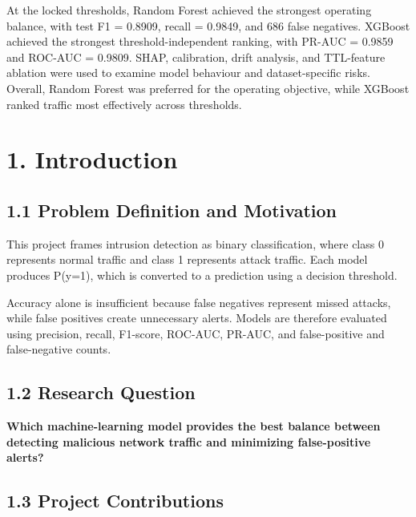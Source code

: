 \documentclass[
  canadian,
  12pt,
]{article}
\let\reportOrigSection\section
\renewcommand{\section}{\par\Needspace*{10\baselineskip}\reportOrigSection}%
\let\reportOrigSubsection\subsection
\renewcommand{\subsection}{\par\Needspace*{8\baselineskip}\reportOrigSubsection}%
\begin{document}
At the locked thresholds, Random Forest achieved the strongest operating
balance, with test F1 = 0.8909, recall = 0.9849, and 686 false
negatives. XGBoost achieved the strongest threshold-independent ranking,
with PR-AUC = 0.9859 and ROC-AUC = 0.9809. SHAP, calibration, drift
analysis, and TTL-feature ablation were used to examine model behaviour
and dataset-specific risks. Overall, Random Forest was preferred for the
operating objective, while XGBoost ranked traffic most effectively
across thresholds.

\section[\texorpdfstring{\numberline{1.}Introduction}{1. Introduction}]{1. Introduction}\label{sec-1}

\subsection[\texorpdfstring{\numberline{1.1}Problem Definition and Motivation}{1.1 Problem Definition and Motivation}]{1.1 Problem Definition and Motivation}\label{sec-1-1}

This project frames intrusion detection as binary classification, where
class 0 represents normal traffic and class 1 represents attack traffic.
Each model produces P(y=1), which is converted to a prediction using a
decision threshold.

Accuracy alone is insufficient because false negatives represent missed
attacks, while false positives create unnecessary alerts. Models are
therefore evaluated using precision, recall, F1-score, ROC-AUC, PR-AUC,
and false-positive and false-negative counts.

\subsection[\texorpdfstring{\numberline{1.2}Research Question}{1.2 Research Question}]{1.2 Research Question}\label{sec-1-2}

\textbf{Which machine-learning model provides the best balance between
detecting malicious network traffic and minimizing false-positive
alerts?}

\subsection[\texorpdfstring{\numberline{1.3}Project Contributions}{1.3 Project Contributions}]{1.3 Project Contributions}\label{sec-1-3}
\end{document}

